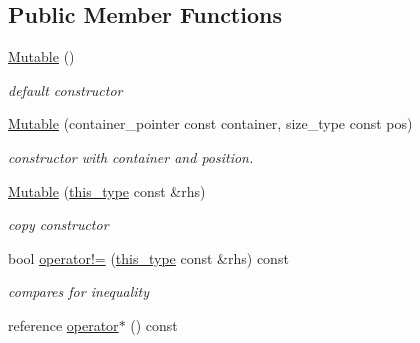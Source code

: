 \subsection*{Public Member Functions}
\begin{DoxyCompactItemize}
\item 
\hypertarget{classhryky_1_1iterator_1_1random_1_1_mutable_ac8ccf7588f3abe88b6783e0a95c6790d}{\hyperlink{classhryky_1_1iterator_1_1random_1_1_mutable_ac8ccf7588f3abe88b6783e0a95c6790d}{Mutable} ()}\label{classhryky_1_1iterator_1_1random_1_1_mutable_ac8ccf7588f3abe88b6783e0a95c6790d}

\begin{DoxyCompactList}\small\item\em default constructor \end{DoxyCompactList}\item 
\hypertarget{classhryky_1_1iterator_1_1random_1_1_mutable_a8a8832f608ad573cb29d12dfde87d678}{\hyperlink{classhryky_1_1iterator_1_1random_1_1_mutable_a8a8832f608ad573cb29d12dfde87d678}{Mutable} (container\-\_\-pointer const container, size\-\_\-type const pos)}\label{classhryky_1_1iterator_1_1random_1_1_mutable_a8a8832f608ad573cb29d12dfde87d678}

\begin{DoxyCompactList}\small\item\em constructor with container and position. \end{DoxyCompactList}\item 
\hypertarget{classhryky_1_1iterator_1_1random_1_1_mutable_a57390bbb8d56d37423e3606706ba97a7}{\hyperlink{classhryky_1_1iterator_1_1random_1_1_mutable_a57390bbb8d56d37423e3606706ba97a7}{Mutable} (\hyperlink{classhryky_1_1iterator_1_1random_1_1_base}{this\-\_\-type} const \&rhs)}\label{classhryky_1_1iterator_1_1random_1_1_mutable_a57390bbb8d56d37423e3606706ba97a7}

\begin{DoxyCompactList}\small\item\em copy constructor \end{DoxyCompactList}\item 
\hypertarget{classhryky_1_1iterator_1_1random_1_1_base_a7b9bf1ad652b48849f90785bc8408a10}{bool \hyperlink{classhryky_1_1iterator_1_1random_1_1_base_a7b9bf1ad652b48849f90785bc8408a10}{operator!=} (\hyperlink{classhryky_1_1iterator_1_1random_1_1_base}{this\-\_\-type} const \&rhs) const }\label{classhryky_1_1iterator_1_1random_1_1_base_a7b9bf1ad652b48849f90785bc8408a10}

\begin{DoxyCompactList}\small\item\em compares for inequality \end{DoxyCompactList}\item 
\hypertarget{classhryky_1_1iterator_1_1random_1_1_base_ac855b032c30109ee9e8c2fa3796c2990}{reference \hyperlink{classhryky_1_1iterator_1_1random_1_1_base_ac855b032c30109ee9e8c2fa3796c2990}{operator$\ast$} () const }\label{classhryky_1_1iterator_1_1random_1_1_base_ac855b032c30109ee9e8c2fa3796c2990}


\end{DoxyCompactItemize}
